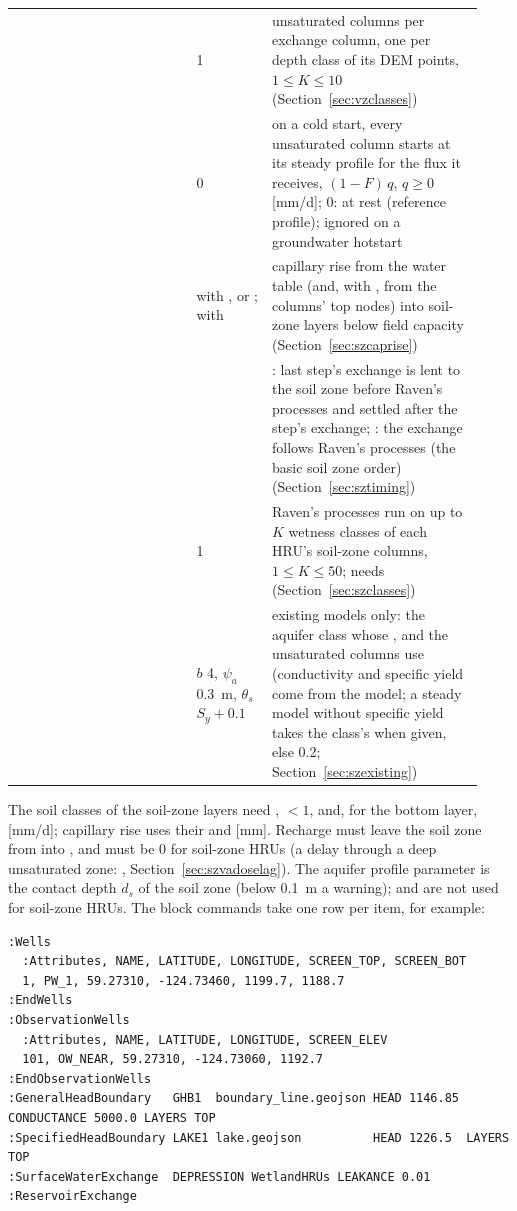 \begin{longtable}{P{0.36\linewidth}P{0.15\linewidth}P{0.42\linewidth}}
 & 1 & unsaturated columns per exchange column, one per depth class of its DEM points, $1\le K\le10$ (Section~\ref{sec:vzclasses})\\
 & 0 & on a cold start, every unsaturated column starts at its steady profile for the flux it receives, $(1-F)\,q$, $q\ge0$ [mm/d]; 0: at rest (reference profile); ignored on a groundwater hotstart\\
 &  with ,  or ;  with  & capillary rise from the water table (and, with , from the columns' top nodes) into soil-zone layers below field capacity (Section~\ref{sec:szcaprise})\\
 &  & : last step's exchange is lent to the soil zone before Raven's processes and settled after the step's exchange; : the exchange follows Raven's processes (the basic soil zone order) (Section~\ref{sec:sztiming})\\
 & 1 & Raven's processes run on up to $K$ wetness classes of each HRU's soil-zone columns, $1\le K\le50$; needs  (Section~\ref{sec:szclasses})\\
 & $b$ 4, $\psi_a$ 0.3~m, $\theta_s$ $S_y+0.1$ & existing models only: the aquifer class whose ,  and  the unsaturated columns use (conductivity and specific yield come from the model; a steady model without specific yield takes the class's  when given, else 0.2; Section~\ref{sec:szexisting})\\\bottomrule
\end{longtable}
The soil classes of the soil-zone layers need ,  $<1$, and, for the bottom layer,
 [mm/d]; capillary rise uses their  and  [mm]. Recharge must leave the
soil zone from  into , and  must be 0 for soil-zone HRUs (a delay through a
deep unsaturated zone: , Section~\ref{sec:szvadoselag}). The
aquifer profile parameter  is the contact depth $d_s$ of the soil zone (below 0.1~m a
warning);  and  are not used for soil-zone HRUs.
The block commands take one row per item, for example:
\begin{lstlisting}
:Wells
  :Attributes, NAME, LATITUDE, LONGITUDE, SCREEN_TOP, SCREEN_BOT
  1, PW_1, 59.27310, -124.73460, 1199.7, 1188.7
:EndWells
:ObservationWells
  :Attributes, NAME, LATITUDE, LONGITUDE, SCREEN_ELEV
  101, OW_NEAR, 59.27310, -124.73060, 1192.7
:EndObservationWells
:GeneralHeadBoundary   GHB1  boundary_line.geojson HEAD 1146.85 CONDUCTANCE 5000.0 LAYERS TOP
:SpecifiedHeadBoundary LAKE1 lake.geojson          HEAD 1226.5  LAYERS TOP
:SurfaceWaterExchange  DEPRESSION WetlandHRUs LEAKANCE 0.01
:ReservoirExchange
\end{lstlisting}

